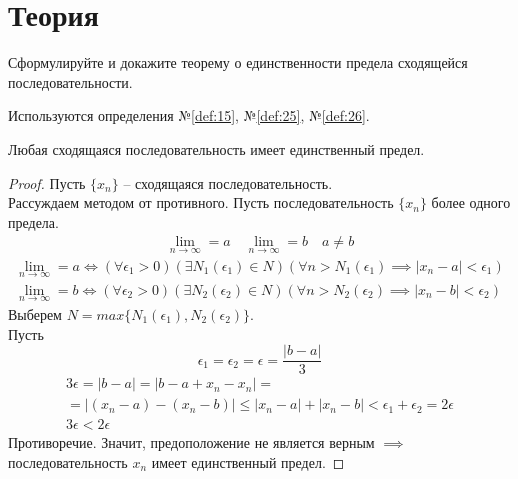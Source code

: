 \section{Теория}


\begin{question}
    Сформулируйте и докажите теорему о единственности предела сходящейся последовательности.
\end{question}
\begin{used}
    Используются определения №\ref{def:15}, №\ref{def:25}, №\ref{def:26}.
\end{used}
\begin{theorem}
    Любая сходящаяся последовательность имеет единственный предел.
\end{theorem}
\begin{proof}
    Пусть $\{x_{n}\} $ -- сходящаяся последовательность. \\
    Рассуждаем методом от противного. Пусть последовательность $\{x_{n}\} $ более одного предела.
    \begin{gather*}
        \lim_{n \to \infty} = a \quad
        \lim_{n \to \infty} = b \quad 
        a \neq b
    \end{gather*}
    \begin{gather}
        \lim_{n \to \infty} = a \iff (\forall \epsilon_1 > 0)(\exists N_1(\epsilon_1) \in N)(\forall n > N_1(\epsilon_1) \implies |x_{n} - a| < \epsilon_1) \\
        \lim_{n \to \infty} = b \iff (\forall \epsilon_2 > 0)(\exists N_2(\epsilon_2) \in N)(\forall n > N_2(\epsilon_2) \implies |x_{n} - b| < \epsilon_2)  
    \end{gather} 
    Выберем $N=max \{N_1\left( \epsilon_1 \right) , N_2\left( \epsilon_2 \right) \}$. \\
    Пусть \[
        \epsilon_1 = \epsilon_2 = \epsilon = \frac{|b - a|}{3}
    \]
    \begin{gather*}
        3 \epsilon = |b - a| = |b - a + x_{n} - x_{n}| = \\
        = |(x_{n} - a) - (x_{n} - b)| \le |x_{n} - a| + |x_{n} - b| < \epsilon_1 + \epsilon_2 = 2 \epsilon \\
        3 \epsilon < 2 \epsilon
    \end{gather*}
    Противоречие. Значит, предоположение не является верным $\implies$ последовательность $x_{n}$ имеет единственный предел.
\end{proof}
\pagebreak


